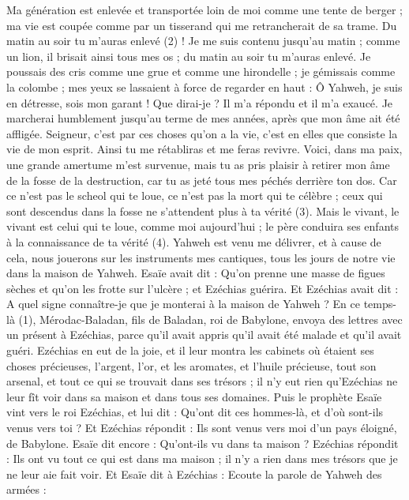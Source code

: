 \begin{multicols}{2}
Ma génération est enlevée et transportée loin de moi comme une tente de berger ; ma vie est coupée comme par un tisserand qui me retrancherait de sa trame. Du matin au soir tu m'auras enlevé (2) !
Je me suis contenu jusqu'au matin ; comme un lion, il brisait ainsi tous mes os ; du matin au soir tu m'auras enlevé.
Je poussais des cris comme une grue et comme une hirondelle ; je gémissais comme la colombe ; mes yeux se lassaient à force de regarder en haut : Ô Yahweh, je suis en détresse, sois mon garant !
Que dirai-je ? Il m'a répondu et il m’a exaucé. Je marcherai humblement jusqu’au terme de mes années, après que mon âme ait été affligée.
Seigneur, c’est par ces choses qu’on a la vie, c’est en elles que consiste la vie de mon esprit. Ainsi tu me rétabliras et me feras revivre.
Voici, dans ma paix, une grande amertume m’est survenue, mais tu as pris plaisir à retirer mon âme de la fosse de la destruction, car tu as jeté tous mes péchés derrière ton dos.
Car ce n’est pas le scheol qui te loue, ce n’est pas la mort qui te célèbre ; ceux qui sont descendus dans la fosse ne s'attendent plus à ta vérité (3).
Mais le vivant, le vivant est celui qui te loue, comme moi aujourd'hui ; le père conduira ses enfants à la connaissance de ta vérité (4).
Yahweh est venu me délivrer, et à cause de cela, nous jouerons sur les instruments mes cantiques, tous les jours de notre vie dans la maison de Yahweh.
Esaïe avait dit : Qu'on prenne une masse de figues sèches et qu'on les frotte sur l'ulcère ; et Ezéchias guérira.
Et Ezéchias avait dit : A quel signe connaître-je que je monterai à la maison de Yahweh ?
\VerseOne{}En ce temps-là (1), Mérodac-Baladan, fils de Baladan, roi de Babylone, envoya des lettres avec un présent à Ezéchias, parce qu'il avait appris qu'il avait été malade et qu'il avait guéri.
Ezéchias en eut de la joie, et il leur montra les cabinets où étaient ses choses précieuses, l'argent, l'or, et les aromates, et l’huile précieuse, tout son arsenal, et tout ce qui se trouvait dans ses trésors ; il n'y eut rien qu'Ezéchias ne leur fît voir dans sa maison et dans tous ses domaines.
Puis le prophète Esaïe vint vers le roi Ezéchias, et lui dit : Qu'ont dit ces hommes-là, et d'où sont-ils venus vers toi ? Et Ezéchias répondit : Ils sont venus vers moi d'un pays éloigné, de Babylone.
Esaïe dit encore : Qu'ont-ils vu dans ta maison ? Ezéchias répondit : Ils ont vu tout ce qui est dans ma maison ; il n'y a rien dans mes trésors que je ne leur aie fait voir.
Et Esaïe dit à Ezéchias : Ecoute la parole de Yahweh des armées :

\end{multicols}
